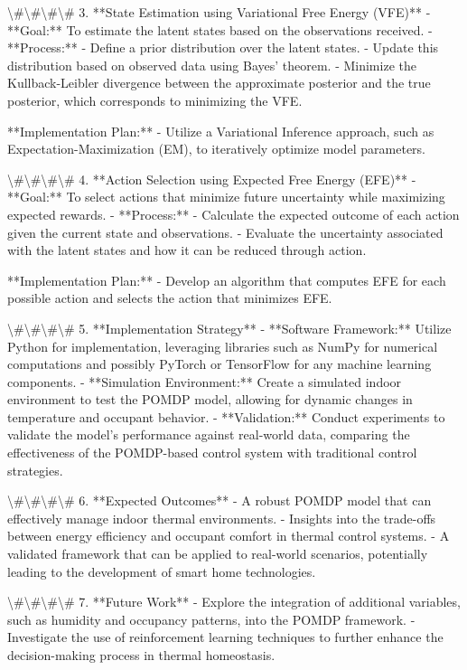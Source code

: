 \documentclass[11pt,a4paper]{article}
\begin{document}
\textbackslash{}#\textbackslash{}#\textbackslash{}#\textbackslash{}# 3. **State Estimation using Variational Free Energy (VFE)**
- **Goal:** To estimate the latent states based on the observations received.
- **Process:**
  - Define a prior distribution over the latent states.
  - Update this distribution based on observed data using Bayes' theorem.
  - Minimize the Kullback-Leibler divergence between the approximate posterior and the true posterior, which corresponds to minimizing the VFE.

**Implementation Plan:**
- Utilize a Variational Inference approach, such as Expectation-Maximization (EM), to iteratively optimize model parameters.

\textbackslash{}#\textbackslash{}#\textbackslash{}#\textbackslash{}# 4. **Action Selection using Expected Free Energy (EFE)**
- **Goal:** To select actions that minimize future uncertainty while maximizing expected rewards.
- **Process:**
  - Calculate the expected outcome of each action given the current state and observations.
  - Evaluate the uncertainty associated with the latent states and how it can be reduced through action.

**Implementation Plan:**
- Develop an algorithm that computes EFE for each possible action and selects the action that minimizes EFE.

\textbackslash{}#\textbackslash{}#\textbackslash{}#\textbackslash{}# 5. **Implementation Strategy**
- **Software Framework:** Utilize Python for implementation, leveraging libraries such as NumPy for numerical computations and possibly PyTorch or TensorFlow for any machine learning components.
- **Simulation Environment:** Create a simulated indoor environment to test the POMDP model, allowing for dynamic changes in temperature and occupant behavior.
- **Validation:** Conduct experiments to validate the model's performance against real-world data, comparing the effectiveness of the POMDP-based control system with traditional control strategies.

\textbackslash{}#\textbackslash{}#\textbackslash{}#\textbackslash{}# 6. **Expected Outcomes**
- A robust POMDP model that can effectively manage indoor thermal environments.
- Insights into the trade-offs between energy efficiency and occupant comfort in thermal control systems.
- A validated framework that can be applied to real-world scenarios, potentially leading to the development of smart home technologies.

\textbackslash{}#\textbackslash{}#\textbackslash{}#\textbackslash{}# 7. **Future Work**
- Explore the integration of additional variables, such as humidity and occupancy patterns, into the POMDP framework.
- Investigate the use of reinforcement learning techniques to further enhance the decision-making process in thermal homeostasis.
\end{document}
